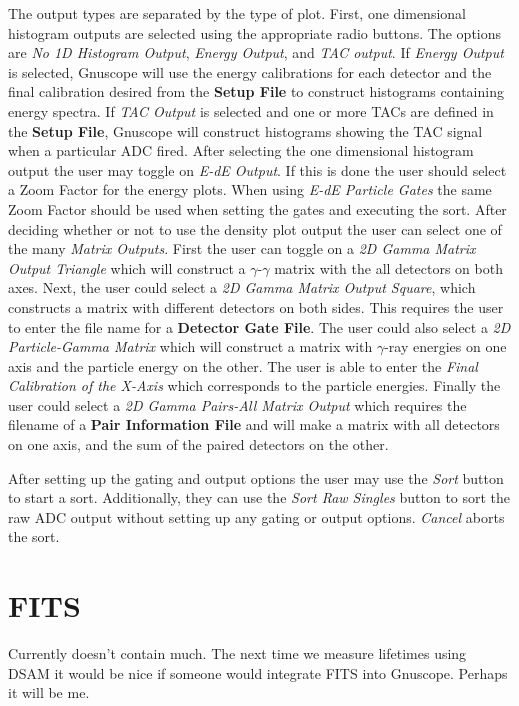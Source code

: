 The output types are separated by the type of plot.  First, one dimensional histogram outputs are selected using the appropriate radio buttons.  The options are {\it No 1D Histogram Output}, {\it Energy Output}, and {\it TAC output}.  If {\it Energy Output} is selected, Gnuscope will use the energy calibrations for each detector and the final calibration desired from the {\bf Setup File} to construct histograms containing energy spectra.  If {\it TAC Output} is selected and one or more TACs are defined in the {\bf Setup File}, Gnuscope will construct histograms showing the TAC signal when a particular ADC fired.  After selecting the one dimensional histogram output the user may toggle on {\it E-dE Output}.  If this is done the user should select a Zoom Factor for the energy plots.  When using {\it E-dE Particle Gates} the same Zoom Factor should be used when setting the gates and executing the sort.  After deciding whether or not to use the density plot output the user can select one of the many {\it Matrix Outputs}.  First the user can toggle on a {\it 2D Gamma Matrix Output Triangle} which will construct a $\gamma$-$\gamma$ matrix with the all detectors on both axes.  Next, the user could select a {\it 2D Gamma Matrix Output Square}, which constructs a matrix with different detectors on both sides.  This requires the user to enter the file name for a {\bf Detector Gate File}.  The user could also select a {\it 2D Particle-Gamma Matrix} which will construct a matrix with $\gamma$-ray energies on one axis and the particle energy on the other.  The user is able to enter the {\it Final Calibration of the X-Axis} which corresponds to the particle energies.  Finally the user could select a {\it 2D Gamma Pairs-All Matrix Output} which requires the filename of a {\bf Pair Information File} and will make a matrix with all detectors on one axis, and the sum of the paired detectors on the other.

After setting up the gating and output options the user may use the {\it Sort} button to start a sort.  Additionally, they can use the {\it Sort Raw Singles} button to sort the raw ADC output without setting up any gating or output options.  {\it Cancel} aborts the sort.

\section{FITS}

Currently doesn't contain much.  The next time we measure lifetimes using DSAM it would be nice if someone would integrate FITS into Gnuscope.  Perhaps it will be me.

